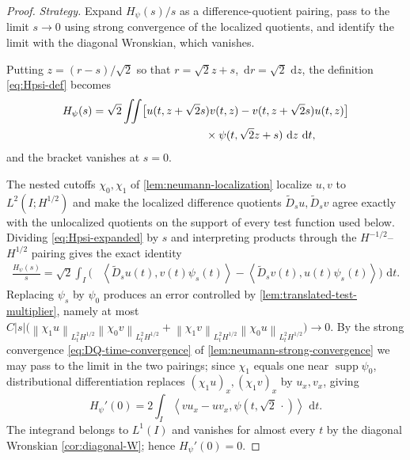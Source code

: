 \documentclass[11pt,oneside]{book}
\providecommand{\uses}[1]{}
\theoremstyle{definition}
\theoremstyle{remark}
\newcommand{\supp}{\operatorname{supp}}
\newcommand{\1}{\mathbf 1}
\newcommand{\dd}{\,\mathrm d}
\newcommand{\norm}[1]{\left\lVert #1\right\rVert}
\newcommand{\abs}[1]{\left\lvert #1\right\rvert}
\newcommand{\pair}[2]{\left\langle #1,#2\right\rangle}
\begin{document}
\begin{proof}
\uses{lem:neumann-localization, lem:neumann-strong-convergence, lem:translated-test-multiplier, cor:diagonal-W}
\emph{Strategy.} Expand $H_\psi(s)/s$ as a difference-quotient pairing, pass to
the limit $s\to0$ using strong convergence of the localized quotients, and
identify the limit with the diagonal Wronskian, which vanishes.

Putting $z=(r-s)/\sqrt2$ so that $r=\sqrt2z+s$, $\dd r=\sqrt2\,\dd z$, the
definition \eqref{eq:Hpsi-def} becomes
\begin{align}
 H_\psi(s)=\sqrt2\iint
 &\big[u(t,z+\sqrt2s)v(t,z)-v(t,z+\sqrt2s)u(t,z)\big]\notag\\
 &\hspace{20mm}\times\psi(t,\sqrt2z+s)\,\dd z\,\dd t, \label{eq:Hpsi-expanded}
\end{align}
and the bracket vanishes at $s=0$.

The nested cutoffs $\chi_0,\chi_1$ of \cref{lem:neumann-localization} localize
$u,v$ to $L^2(I;H^{1/2})$ and make the localized difference quotients
$\widetilde D_su,\widetilde D_sv$ agree exactly with the unlocalized quotients on
the support of every test function used below. Dividing
\eqref{eq:Hpsi-expanded} by $s$ and interpreting products through the
$H^{-1/2}$--$H^{1/2}$ pairing gives the exact identity
\begin{align}
 \frac{H_\psi(s)}s
 =\sqrt2\int_I\Big(
   &\pair{\widetilde D_su(t)}{v(t)\psi_s(t)}
    -\pair{\widetilde D_sv(t)}{u(t)\psi_s(t)}\Big)\,\dd t. \label{eq:Hpsi-dq-exact}
\end{align}
Replacing $\psi_s$ by $\psi_0$ produces an error controlled by
\cref{lem:translated-test-multiplier}, namely at most
$C\abs s\big(\norm{\chi_1u}_{L^2_tH^{1/2}}\norm{\chi_0v}_{L^2_tH^{1/2}}
+\norm{\chi_1v}_{L^2_tH^{1/2}}\norm{\chi_0u}_{L^2_tH^{1/2}}\big)\to0$. By the
strong convergence \eqref{eq:DQ-time-convergence} of
\cref{lem:neumann-strong-convergence} we may pass to the limit in the two
pairings; since $\chi_1$ equals one near $\supp\psi_0$, distributional
differentiation replaces $(\chi_1u)_x,(\chi_1v)_x$ by $u_x,v_x$, giving
\begin{equation}
 H_\psi'(0)=2\int_I\pair{vu_x-uv_x}{\psi(t,\sqrt2\,\cdot)}\,\dd t.
 \label{eq:Hpsi-prime-W}
\end{equation}
The integrand belongs to $L^1(I)$ and vanishes for almost every $t$ by the
diagonal Wronskian \cref{cor:diagonal-W}; hence $H_\psi'(0)=0$.
\end{proof}
\end{document}
